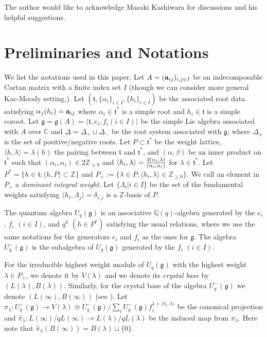 The author would like to acknowledge Masaki Kashiwara for 
discussions and his helpful suggestions.

 

\section{Preliminaries and Notations}
\setcounter{equation}{0}

We list the notations used in this paper.
Let  
 $A=({\bf a}_{ij})_{i,j\in I}$ be 
an indecomposable Cartan matrix
with a finite index set $I$
(though we can consider more general Kac-Moody setting.).
Let $({\mathfrak t},\{{\alpha}_i\}_{i\in I},\{h_i\}_{i\in I})$ 
be the associated
root data 
satisfying ${\alpha}_j(h_i)={\bf a}_{ij}$ where 
${\alpha}_i\in {\mathfrak t}^*$ is a simple root and 
$h_i\in {\mathfrak t}$ is a simple coroot.
Let ${\mathfrak g}={\mathfrak g}(A)={\langle} {\mathfrak t},e_i,f_i(i\in I){\rangle}$ 
be the simple Lie algebra associated with $A$
over ${\mathbb C}$ and ${\Delta}={\Delta}_+\sqcup{\Delta}_-$
be the root system associated with ${\mathfrak g}$, where ${\Delta}_{\pm}$ is 
the set of positive/negative roots.
Let $P \subset {\mathfrak t}^*$ be the weight lattice, 
${\langle} h,{\lambda}{\rangle}={\lambda}(h)$ the pairing between ${\mathfrak t}$ and ${\mathfrak t}^*$,
and $({\alpha}, \beta)$ be an inner product on
${\mathfrak t}^*$ such that $({\alpha}_i,{\alpha}_i)\in 2{\mathbb Z}_{\geq 0}$ and
${\langle} h_i,{\lambda}{\rangle}={{2({\alpha}_i,{\lambda})}\over{({\alpha}_i,{\alpha}_i)}}$
for ${\lambda}\in{\mathfrak t}^*$.
Let $P^*=\{h\in {\mathfrak t}: {\langle} h,P{\rangle}\subset{\mathbb Z}\}$ and
$P_+:=\{{\lambda}\in P:{\langle} h_i,{\lambda}{\rangle}\in{\mathbb Z}_{\geq 0}\}$.
We call an element in $P_+$ a {\it dominant integral weight}.
Let $\{{\Lambda}_i|i\in I\}$ be the set of the fundamental weights satisfying
${\langle} h_i,{\Lambda}_j{\rangle}={\delta}_{i,j}$ is a ${\mathbb Z}$-basis of $P$.

The quantum algebra ${U_q({\mathfrak g})}$
is an associative
${\mathbb Q}(q)$-algebra generated by the $e_i$, $f_i \,\, (i\in I)$,
and $q^h \,\, (h\in P^*)$
satisfying the usual relations, where we use the same notations for the 
generators $e_i$ and $f_i$ as the ones for ${\mathfrak g}$.
The algebra ${U^-_q({\mathfrak g})}$ is the subalgebra of ${U_q({\mathfrak g})}$ generated 
by the $f_i$ $(i\in I)$.

For the irreducible highest weight module of ${U_q({\mathfrak g})}$
with the highest weight ${\lambda}\in P_+$, we denote it by $V({\lambda})$
and we denote its {\it crystal base}  by $(L({\lambda}),B({\lambda}))$.
Similarly, for the crystal base of the algebra ${U^-_q({\mathfrak g})}$ we denote 
$(L({\infty}),B({\infty}))$ (see \cite{K0,K1}).
Let $\pi_{\lambda}:{U^-_q({\mathfrak g})}\longrightarrow V({\lambda})\cong {U^-_q({\mathfrak g})}/{\sum_i{U^-_q({\mathfrak g})}
f_i^{1+{\langle} h_i,{\lambda}{\rangle}}}$ be the canonical projection and 
$\widehat \pi_{\lambda}:L({\infty})/qL({\infty})\longrightarrow L({\lambda})/qL({\lambda})$
be the induced map from $\pi_{\lambda}$. Here note that 
$\widehat \pi_{\lambda}(B({\infty}))=B({\lambda})\sqcup\{0\}$.

